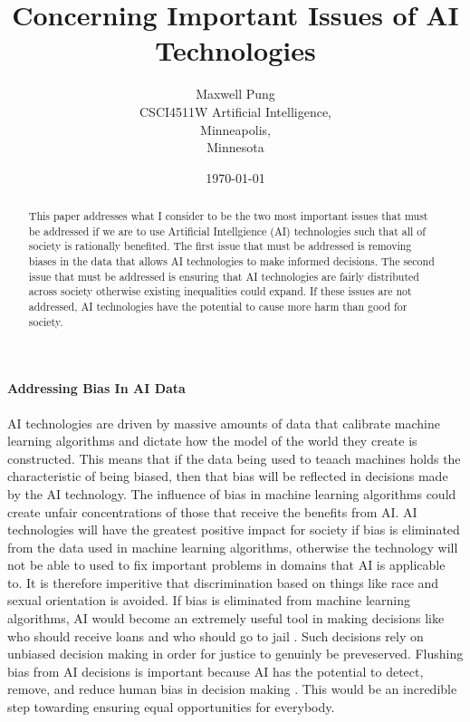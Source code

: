 \documentclass[12pt]{article}
\begin{document}
\title{Concerning Important Issues of AI Technologies}
\author{Maxwell Pung\\
	CSCI4511W Artificial Intelligence,\\
	Minneapolis,\\
	Minnesota}
\date{\today}
\maketitle

\newpage

\begin{abstract}
This paper addresses what I consider to be the two most important issues that must be addressed if we are to use Artificial Intellgience (AI) technologies such that all of society is rationally benefited. The first issue that must be addressed is removing biases in the data that allows AI technologies to make informed decisions. The second issue that must be addressed is ensuring that AI technologies are fairly distributed across society otherwise existing inequalities could expand. If these issues are not addressed, AI technologies have the potential to cause more harm than good for society. 
\end{abstract}

\paragraph{Addressing Bias In AI Data\\}
AI technologies are driven by massive amounts of data that calibrate machine learning algorithms and dictate how the model of the world they create is constructed. This means that if the data being used to teaach machines holds the characteristic of being biased, then that bias will be reflected in decisions made by the AI technology. The influence of bias in machine learning algorithms could create unfair concentrations of those that receive the benefits from AI. AI technologies will have the greatest positive impact for society if bias is eliminated from the data used in machine learning algorithms, otherwise the technology will not be able to used to fix important problems in domains that AI is applicable to. It is therefore imperitive that discrimination based on things like race and sexual orientation is avoided. If bias is eliminated from machine learning algorithms, AI would become an extremely useful tool in making decisions like who should receive loans and who should go to jail \cite[pg. 43]{twentythirty}. Such decisions rely on unbiased decision making in order for justice to genuinly be preveserved. Flushing bias from AI decisions is important because AI has the potential to detect, remove, and reduce human bias in decision making \cite[pg. 37]{twentythirty}. This would be an incredible step towarding ensuring equal opportunities for everybody. 
\end{document}

